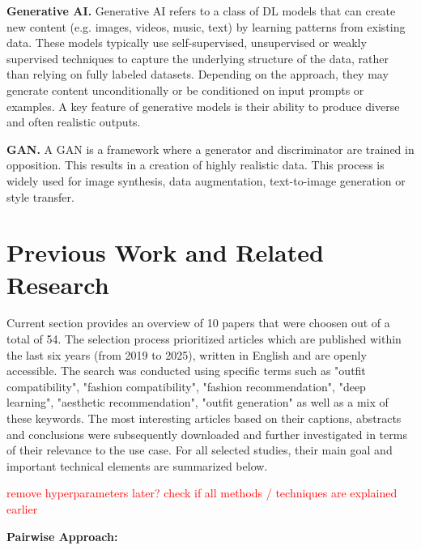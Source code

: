 \vspace{0.5cm}

\textbf{Generative \ac{AI}.}
Generative \ac{AI} refers to a class of \ac{DL} models that can create new content (e.g. images, videos, music, text) by learning patterns from existing data. These models typically use self-supervised, unsupervised or weakly supervised techniques to capture the underlying structure of the data, rather than relying on fully labeled datasets. Depending on the approach, they may generate content unconditionally or be conditioned on input prompts or examples. A key feature of generative models is their ability to produce diverse and often realistic outputs. \cite[cf.]{sengar_generative_2024}

\vspace{0.5cm}

\textbf{\ac{GAN}.}
A \acs{GAN} is a framework where a generator and discriminator are trained in opposition. This results in a creation of highly realistic data. This process is widely used for image synthesis, data augmentation, text-to-image generation or style transfer. \cite[cf.]{goodfellow_generative_2014}

\section{Previous Work and Related Research}

Current section provides an overview of 10 papers that were choosen out of a total of 54. The selection process prioritized articles which are published within the last six years (from 2019 to 2025), written in English and are openly accessible. The search was conducted using specific terms such as "outfit compatibility", "fashion compatibility", "fashion recommendation", "deep learning", "aesthetic recommendation", "outfit generation" as well as a mix of these keywords. The most interesting articles based on their captions, abstracts and conclusions were subsequently downloaded and further investigated  in terms of their relevance to the use case. For all selected studies, their main goal and important technical elements are summarized below.

\textcolor{red}{remove hyperparameters later? check if all methods / techniques are explained earlier}

\vspace{0.5cm}

\textbf{Pairwise Approach:}

\vspace{0.5cm}

